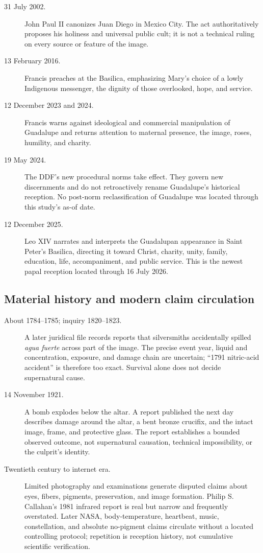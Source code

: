 \begin{description}
  \item[31 July 2002.] John Paul II canonizes Juan Diego in Mexico City. The act authoritatively proposes his holiness and universal public cult; it is not a technical ruling on every source or feature of the image.

  \item[13 February 2016.] Francis preaches at the Basilica, emphasizing Mary's choice of a lowly Indigenous messenger, the dignity of those overlooked, hope, and service.

  \item[12 December 2023 and 2024.] Francis warns against ideological and commercial manipulation of Guadalupe and returns attention to maternal presence, the image, roses, humility, and charity.

  \item[19 May 2024.] The DDF's new procedural norms take effect. They govern new discernments and do not retroactively rename Guadalupe's historical reception. No post-norm reclassification of Guadalupe was located through this study's as-of date.

  \item[12 December 2025.] Leo XIV narrates and interprets the Guadalupan appearance in Saint Peter's Basilica, directing it toward Christ, charity, unity, family, education, life, accompaniment, and public service. This is the newest papal reception located through 16 July 2026.
\end{description}

\subsection{Material history and modern claim circulation}

\begin{description}
  \item[About 1784--1785; inquiry 1820--1823.] A later juridical file records reports that silversmiths accidentally spilled \emph{agua fuerte} across part of the image. The precise event year, liquid and concentration, exposure, and damage chain are uncertain; “1791 nitric-acid accident” is therefore too exact. Survival alone does not decide supernatural cause.

  \item[14 November 1921.] A bomb explodes below the altar. A report published the next day describes damage around the altar, a bent bronze crucifix, and the intact image, frame, and protective glass. The report establishes a bounded observed outcome, not supernatural causation, technical impossibility, or the culprit's identity.

  \item[Twentieth century to internet era.] Limited photography and examinations generate disputed claims about eyes, fibers, pigments, preservation, and image formation. Philip S. Callahan's 1981 infrared report is real but narrow and frequently overstated. Later NASA, body-temperature, heartbeat, music, constellation, and absolute no-pigment claims circulate without a located controlling protocol; repetition is reception history, not cumulative scientific verification.
\end{description}
